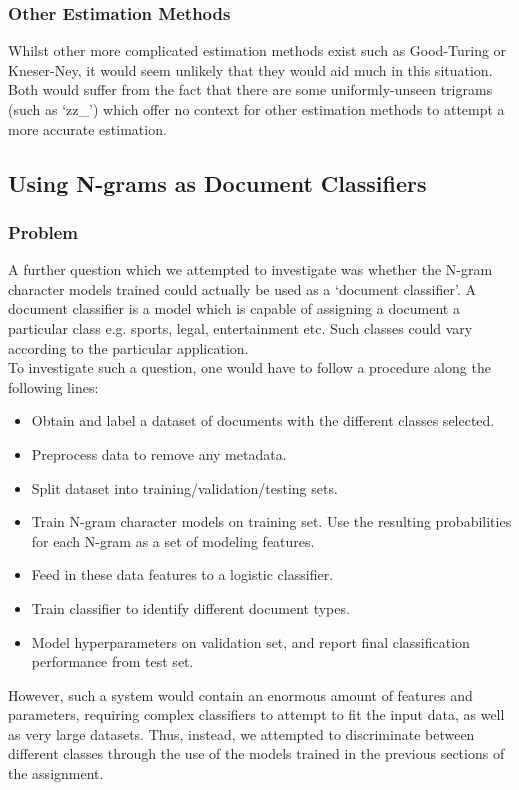 \documentclass[12pt]{article}
\begin{document}
\subsubsection{Other Estimation Methods}
Whilst other more complicated estimation methods exist such as Good-Turing or Kneser-Ney, it would seem unlikely that they would aid much in this situation.  Both would suffer from the fact that there are some uniformly-unseen trigrams (such as `zz\_') which offer no context for other estimation methods to attempt a more accurate estimation.

\subsection{Using N-grams as Document Classifiers}
\subsubsection{Problem}
A further question which we attempted to investigate was whether the N-gram character models trained could actually be used as a `document classifier'.  A document classifier is a model which is capable of assigning a document a particular class e.g. sports, legal, entertainment etc.  Such classes could vary according to the particular application.\\
\hfill\break
To investigate such a question, one would have to follow a procedure along the following lines:
\begin{itemize}
	\item  Obtain and label a dataset of documents with the different classes selected.
	\item Preprocess data to remove any metadata.
	\item  Split dataset into training/validation/testing sets.
	\item  Train N-gram character models on training set.  Use the resulting probabilities for each N-gram as a set of modeling features.
	\item  Feed in these data features to a logistic classifier.
	\item  Train classifier to identify different document types.
	\item  Model hyperparameters on validation set, and report final classification performance from test set. 
\end{itemize}
However, such a system would contain an enormous amount of features and parameters, requiring complex classifiers to attempt to fit the input data, as well as very large datasets.  Thus, instead, we attempted to discriminate between different classes through the use of the models trained in the previous sections of the assignment.  
\end{document}
